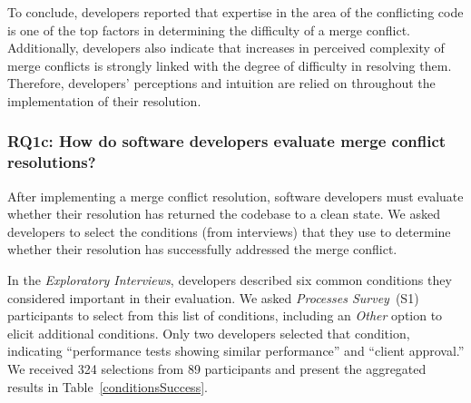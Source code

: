 
To conclude, developers reported that expertise in the area of the conflicting code is one of the top factors in determining the difficulty of a merge conflict.
Additionally, developers also indicate that increases in perceived complexity of merge conflicts is strongly linked with the degree of difficulty in resolving them.
Therefore, developers' perceptions and intuition are relied on throughout the implementation of their resolution.

\subsubsection{\textbf{RQ1c}: How do software developers \textbf{evaluate} merge conflict resolutions?}\label{RQ1c}

After implementing a merge conflict resolution, software developers must evaluate whether their resolution has returned the codebase to a clean state.
We asked developers to select the conditions (from interviews) that they use to determine whether their resolution has successfully addressed the merge conflict.


In the \textit{Exploratory Interviews}, developers described six common conditions they considered important in their evaluation.
We asked \textit{Processes Survey}~(S1) participants to select from this list of conditions, including an \textit{Other} option to elicit additional conditions.
Only two developers selected that condition, indicating ``performance tests showing similar performance'' and ``client approval.''
We received 324 selections from 89 participants and present the aggregated results in Table~\ref{conditionsSuccess}.

